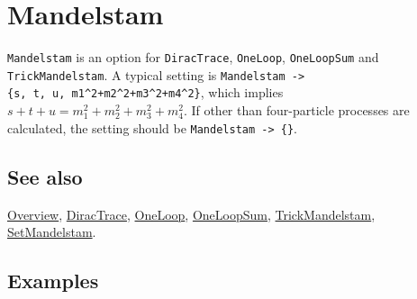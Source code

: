 \documentclass[../FeynCalcManual.tex]{subfiles}
\begin{document}
\begin{Shaded}
\begin{Highlighting}[]
 
\end{Highlighting}
\end{Shaded}

\hypertarget{mandelstam}{
\section{Mandelstam}\label{mandelstam}}

\texttt{Mandelstam} is an option for \texttt{DiracTrace},
\texttt{OneLoop}, \texttt{OneLoopSum} and \texttt{TrickMandelstam}. A
typical setting is
\texttt{Mandelstam -> \{\allowbreak{}s,\ \allowbreak{}t,\ \allowbreak{}u,\ \allowbreak{}m1^2+m2^2+m3^2+m4^2\}},
which implies \(s + t + u = m_1^2+m_2^2+m_3^2+m_4^2\). If other than
four-particle processes are calculated, the setting should be
\texttt{Mandelstam -> \{\allowbreak{}\}}.

\subsection{See also}

\hyperlink{toc}{Overview}, \hyperlink{diractrace}{DiracTrace},
\hyperlink{oneloop}{OneLoop}, \hyperlink{oneloopsum}{OneLoopSum},
\hyperlink{trickmandelstam}{TrickMandelstam},
\hyperlink{setmandelstam}{SetMandelstam}.

\subsection{Examples}
\end{document}
